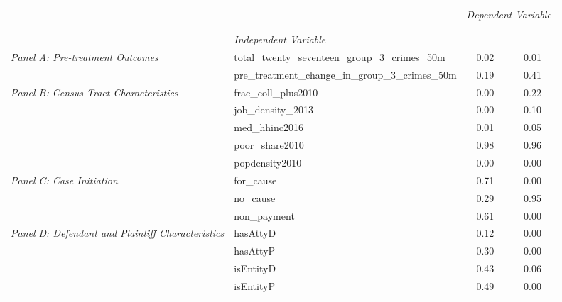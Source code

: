 \begin{tabular}{llcc}
\toprule
 &  & \multicolumn{2}{c}{\textit{Dependent Variable}} \\
\cline{3-4}
\\
 &  &  &  \\
 & \emph{Independent Variable} &  &  \\
\midrule
\multirow[c]{2}{3cm}{\textit{Panel A: Pre-treatment Outcomes}} & total_twenty_seventeen_group_3_crimes_50m & 0.02 & 0.01 \\
 & pre_treatment_change_in_group_3_crimes_50m & 0.19 & 0.41 \\
\cline{1-4}
\multirow[c]{5}{3cm}{\textit{Panel B: Census Tract Characteristics}} & frac_coll_plus2010 & 0.00 & 0.22 \\
 & job_density_2013 & 0.00 & 0.10 \\
 & med_hhinc2016 & 0.01 & 0.05 \\
 & poor_share2010 & 0.98 & 0.96 \\
 & popdensity2010 & 0.00 & 0.00 \\
\cline{1-4}
\multirow[c]{3}{3cm}{\textit{Panel C: Case Initiation}} & for_cause & 0.71 & 0.00 \\
 & no_cause & 0.29 & 0.95 \\
 & non_payment & 0.61 & 0.00 \\
\cline{1-4}
\multirow[c]{4}{3cm}{\textit{Panel D: Defendant and Plaintiff Characteristics}} & hasAttyD & 0.12 & 0.00 \\
 & hasAttyP & 0.30 & 0.00 \\
 & isEntityD & 0.43 & 0.06 \\
 & isEntityP & 0.49 & 0.00 \\
\cline{1-4}
\bottomrule
\end{tabular}

